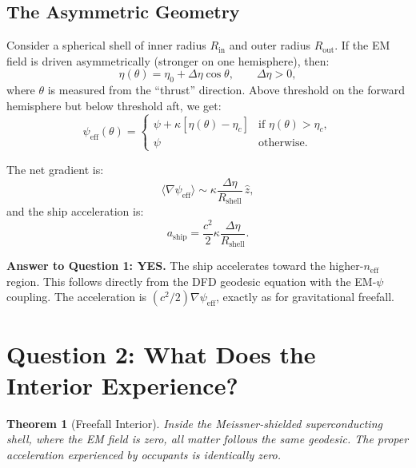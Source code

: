 \documentclass[12pt, letterpaper]{article}
\newtheorem{theorem}{Theorem}
\theoremstyle{definition}
\theoremstyle{remark}
\newcommand{\neff}{n_{\mathrm{eff}}}
\newcommand{\etac}{\eta_c}
\begin{document}
\subsection{The Asymmetric Geometry}

Consider a spherical shell of inner radius $R_{\mathrm{in}}$ and outer radius
$R_{\mathrm{out}}$. If the EM field is driven asymmetrically (stronger on one
hemisphere), then:
\begin{equation}
\eta(\theta) = \eta_0 + \Delta\eta \cos\theta,
\qquad \Delta\eta > 0,
\end{equation}
where $\theta$ is measured from the ``thrust'' direction. Above threshold on
the forward hemisphere but below threshold aft, we get:
\begin{equation}
\psi_{\mathrm{eff}}(\theta) =
\begin{cases}
\psi + \kappa[\eta(\theta) - \etac] & \text{if } \eta(\theta) > \etac, \\
\psi & \text{otherwise}.
\end{cases}
\end{equation}

The net gradient is:
\begin{equation}
\langle \nabla \psi_{\mathrm{eff}} \rangle \sim
\kappa \frac{\Delta\eta}{R_{\mathrm{shell}}} \, \hat{z},
\end{equation}
and the ship acceleration is:
\begin{equation}
a_{\mathrm{ship}} = \frac{c^2}{2} \kappa \frac{\Delta\eta}{R_{\mathrm{shell}}}.
\label{eq:ship-accel}
\end{equation}

\textbf{Answer to Question 1: YES.} The ship accelerates toward the
higher-$\neff$ region. This follows directly from the DFD geodesic equation
with the EM-$\psi$ coupling. The acceleration is $(c^2/2)\nabla\psi_{\mathrm{eff}}$,
exactly as for gravitational freefall.

\section{Question 2: What Does the Interior Experience?}
\label{sec:Q2}

\begin{theorem}[Freefall Interior]
Inside the Meissner-shielded superconducting shell, where the EM field is
zero, all matter follows the same geodesic. The proper acceleration
experienced by occupants is identically zero.
\end{theorem}
\end{document}
